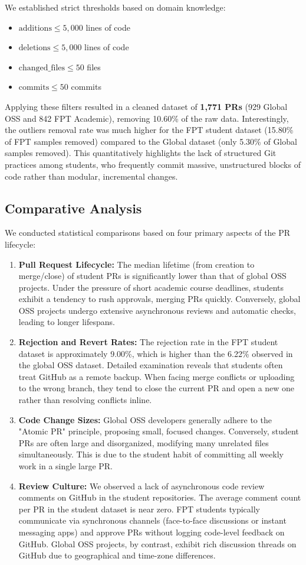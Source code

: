 \documentclass[conference]{IEEEtran}
\begin{document}
We established strict thresholds based on domain knowledge:
\begin{itemize}
  \item $\text{additions} \le 5,000$ lines of code
  \item $\text{deletions} \le 5,000$ lines of code
  \item $\text{changed\_files} \le 50$ files
  \item $\text{commits} \le 50$ commits
\end{itemize}

Applying these filters resulted in a cleaned dataset of \textbf{1,771 PRs} (929 Global OSS and 842 FPT Academic), removing 10.60\% of the raw data. Interestingly, the outliers removal rate was much higher for the FPT student dataset (15.80\% of FPT samples removed) compared to the Global dataset (only 5.30\% of Global samples removed). This quantitatively highlights the lack of structured Git practices among students, who frequently commit massive, unstructured blocks of code rather than modular, incremental changes.

\subsection{Comparative Analysis}
We conducted statistical comparisons based on four primary aspects of the PR lifecycle:
\begin{enumerate}
  \item \textbf{Pull Request Lifecycle:} The median lifetime (from creation to merge/close) of student PRs is significantly lower than that of global OSS projects. Under the pressure of short academic course deadlines, students exhibit a tendency to rush approvals, merging PRs quickly. Conversely, global OSS projects undergo extensive asynchronous reviews and automatic checks, leading to longer lifespans.
  \item \textbf{Rejection and Revert Rates:} The rejection rate in the FPT student dataset is approximately 9.00\%, which is higher than the 6.22\% observed in the global OSS dataset. Detailed examination reveals that students often treat GitHub as a remote backup. When facing merge conflicts or uploading to the wrong branch, they tend to close the current PR and open a new one rather than resolving conflicts inline.
  \item \textbf{Code Change Sizes:} Global OSS developers generally adhere to the "Atomic PR" principle, proposing small, focused changes. Conversely, student PRs are often large and disorganized, modifying many unrelated files simultaneously. This is due to the student habit of committing all weekly work in a single large PR.
  \item \textbf{Review Culture:} We observed a lack of asynchronous code review comments on GitHub in the student repositories. The average comment count per PR in the student dataset is near zero. FPT students typically communicate via synchronous channels (face-to-face discussions or instant messaging apps) and approve PRs without logging code-level feedback on GitHub. Global OSS projects, by contrast, exhibit rich discussion threads on GitHub due to geographical and time-zone differences.
\end{enumerate}
\end{document}

